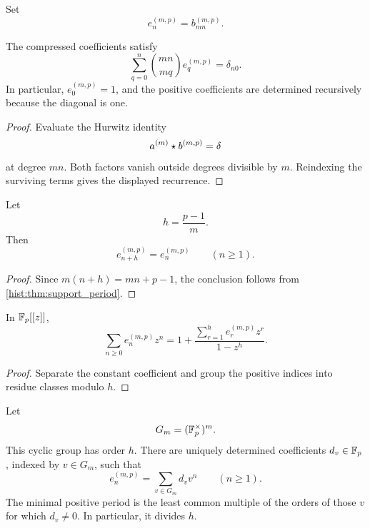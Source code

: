 \begin{histdefinition}\label{hist:def:compressed_inverse}
Set
\[
e_n^{(m,p)}
=
b_{mn}^{(m,p)}.
\]
\end{histdefinition}

\begin{histproposition}\label{hist:prop:compressed_inverse_recurrence}
The compressed coefficients satisfy
\[
\boxed{
\sum_{q=0}^{n}
\binom{mn}{mq}
e_q^{(m,p)}
=
\delta_{n0}.
}
\]
In particular, \(e_0^{(m,p)}=1\), and the positive coefficients are determined recursively because the diagonal is one.
\end{histproposition}

\begin{proof}
Evaluate the Hurwitz identity
\[
a^{(m)}\mathbin{\star} b^{(m,p)}=\delta
\]
at degree \(mn\). Both factors vanish outside degrees divisible by \(m\). Reindexing the surviving terms gives the displayed recurrence.
\end{proof}

\begin{histcorollary}\label{hist:cor:compressed_period}
Let
\[
h=\frac{p-1}{m}.
\]
Then
\[
\boxed{
e_{n+h}^{(m,p)}
=
e_n^{(m,p)}
\qquad(n\geq1).
}
\]
\end{histcorollary}

\begin{proof}
Since \(m(n+h)=mn+p-1\), the conclusion follows from \cref{hist:thm:support_period}.
\end{proof}

\begin{histcorollary}\label{hist:cor:periodic_ogf}
In \(\mathbb F_p[[z]]\),
\[
\boxed{
\sum_{n\geq0}e_n^{(m,p)}z^n
=
1+
\frac{
\sum_{r=1}^{h}e_r^{(m,p)}z^r
}{1-z^h}.
}
\]
\end{histcorollary}

\begin{proof}
Separate the constant coefficient and group the positive indices into residue classes modulo \(h\).
\end{proof}

\begin{histtheorem}\label{hist:thm:minimal_period}
Let
\[
G_m=(\mathbb F_p^\times)^m.
\]
This cyclic group has order \(h\). There are uniquely determined coefficients \(d_v\in\mathbb F_p\), indexed by \(v\in G_m\), such that
\[
\boxed{
e_n^{(m,p)}
=
\sum_{v\in G_m}d_vv^n
\qquad(n\geq1).
}
\]
The minimal positive period is the least common multiple of the orders of those \(v\) for which \(d_v\neq0\). In particular, it divides \(h\).
\end{histtheorem}

